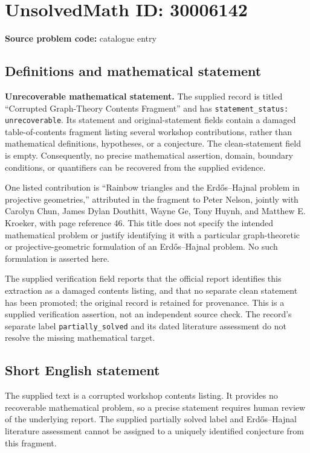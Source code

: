 \documentclass[11pt]{article}
\begin{document}
\section*{UnsolvedMath ID: 30006142}
\textbf{Source problem code:} catalogue entry
\subsection{Definitions and mathematical statement}
\textbf{Unrecoverable mathematical statement.} The supplied record is titled ``Corrupted Graph-Theory Contents Fragment'' and has \texttt{statement\_status: unrecoverable}. Its statement and original-statement fields contain a damaged table-of-contents fragment listing several workshop contributions, rather than mathematical definitions, hypotheses, or a conjecture. The clean-statement field is empty. Consequently, no precise mathematical assertion, domain, boundary conditions, or quantifiers can be recovered from the supplied evidence.

One listed contribution is ``Rainbow triangles and the Erdős--Hajnal problem in projective geometries,'' attributed in the fragment to Peter Nelson, jointly with Carolyn Chun, James Dylan Douthitt, Wayne Ge, Tony Huynh, and Matthew E. Kroeker, with page reference 46. This title does not specify the intended mathematical problem or justify identifying it with a particular graph-theoretic or projective-geometric formulation of an Erdős--Hajnal problem. No such formulation is asserted here.

The supplied verification field reports that the official report identifies this extraction as a damaged contents listing, and that no separate clean statement has been promoted; the original record is retained for provenance. This is a supplied verification assertion, not an independent source check. The record's separate label \texttt{partially\_solved} and its dated literature assessment do not resolve the missing mathematical target.
\subsection{Short English statement}
The supplied text is a corrupted workshop contents listing. It provides no recoverable mathematical problem, so a precise statement requires human review of the underlying report. The supplied partially solved label and Erdős--Hajnal literature assessment cannot be assigned to a uniquely identified conjecture from this fragment.
\end{document}
